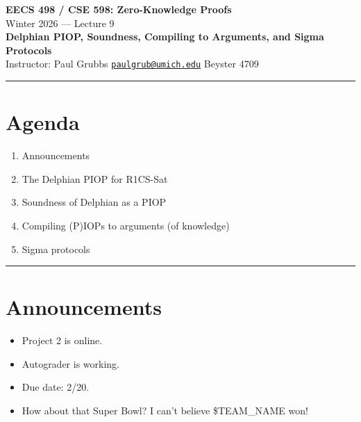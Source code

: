 \documentclass[11pt]{article}
\begin{document}
\begin{center}
  {\LARGE \textbf{EECS 498 / CSE 598: Zero-Knowledge Proofs}}\\[6pt]
  {\large Winter 2026 \quad --- \quad Lecture 9}\\[4pt]
  {\large \textbf{Delphian PIOP, Soundness, Compiling to Arguments, and Sigma Protocols}}\\[4pt]
  {\normalsize Instructor: Paul Grubbs \quad
    \href{mailto:paulgrub@umich.edu}{\texttt{paulgrub@umich.edu}} \quad
    Beyster 4709}
\end{center}

\hrule
\vspace{10pt}

\section*{Agenda}
\begin{enumerate}
  \item Announcements
  \item The Delphian PIOP for R1CS-Sat
  \item Soundness of Delphian as a PIOP
  \item Compiling (P)IOPs to arguments (of knowledge)
  \item Sigma protocols
\end{enumerate}

\hrule
\vspace{10pt}

\section{Announcements}

\begin{itemize}
  \item Project 2 is online.
  \item Autograder is working.
  \item Due date: 2/20.
  \item How about that Super Bowl? I can't believe \$TEAM\_NAME won!
\end{itemize}
\end{document}
